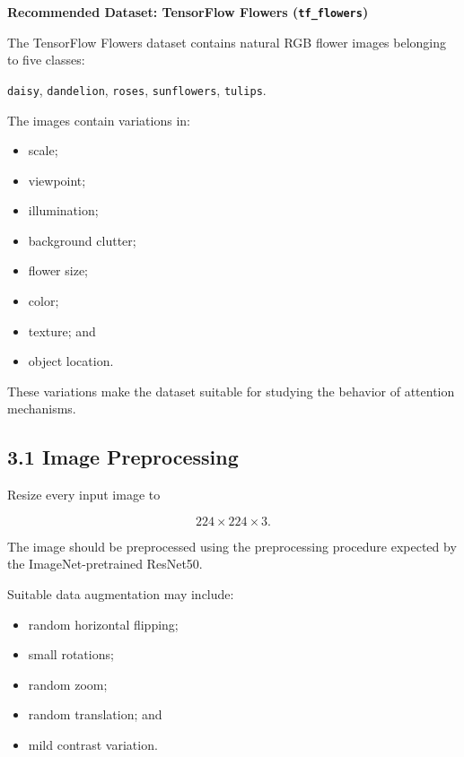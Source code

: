 \documentclass[10pt]{article}
\begin{document}
\textbf{Recommended Dataset: TensorFlow Flowers (\texttt{tf\_flowers})}

The TensorFlow Flowers dataset contains natural RGB flower images belonging
to five classes:

\begin{center}
\texttt{daisy},
\quad
\texttt{dandelion},
\quad
\texttt{roses},
\quad
\texttt{sunflowers},
\quad
\texttt{tulips}.
\end{center}

The images contain variations in:

\begin{itemize}

\item scale;

\item viewpoint;

\item illumination;

\item background clutter;

\item flower size;

\item color;

\item texture; and

\item object location.

\end{itemize}

These variations make the dataset suitable for studying the behavior of
attention mechanisms.

\subsection*{3.1 Image Preprocessing}

Resize every input image to

\[
224\times224\times3.
\]

The image should be preprocessed using the preprocessing procedure expected
by the ImageNet-pretrained ResNet50.

Suitable data augmentation may include:

\begin{itemize}

\item random horizontal flipping;

\item small rotations;

\item random zoom;

\item random translation; and

\item mild contrast variation.

\end{itemize}
\end{document}
